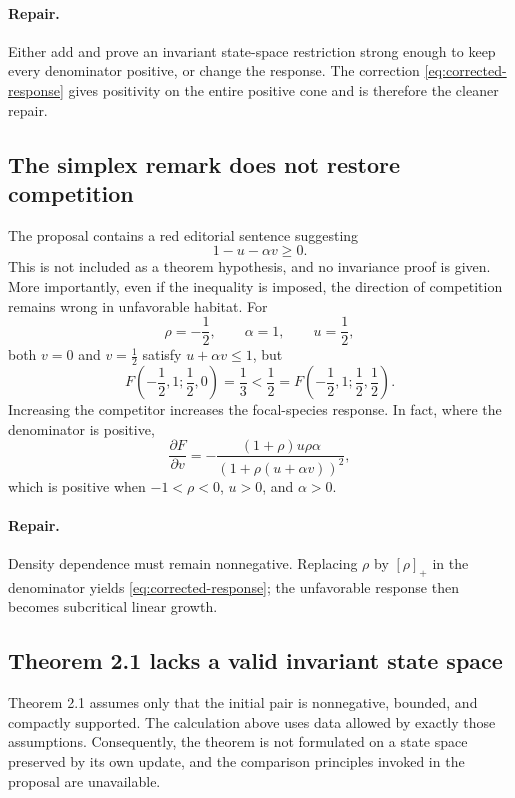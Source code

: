 \documentclass[11pt]{article}
\theoremstyle{definition}
\begin{document}
\paragraph{Repair.}
Either add and prove an invariant state-space restriction strong enough to
keep every denominator positive, or change the response.  The correction
\eqref{eq:corrected-response} gives positivity on the entire positive cone
and is therefore the cleaner repair.

\subsection{The simplex remark does not restore competition}

The proposal contains a red editorial sentence suggesting
\[
  1-u-\alpha v\geq0.
\]
This is not included as a theorem hypothesis, and no invariance proof is
given.  More importantly, even if the inequality is imposed, the direction
of competition remains wrong in unfavorable habitat.  For
\[
  \rho=-\frac12,\qquad \alpha=1,\qquad u=\frac12,
\]
both \(v=0\) and \(v=\frac12\) satisfy \(u+\alpha v\leq1\), but
\[
  F\!\left(-\frac12,1;\frac12,0\right)=\frac13
  <
  \frac12
  =
  F\!\left(-\frac12,1;\frac12,\frac12\right).
\]
Increasing the competitor increases the focal-species response.  In fact,
where the denominator is positive,
\[
  \frac{\partial F}{\partial v}
  =
  -\frac{(1+\rho)u\rho\alpha}
         {(1+\rho(u+\alpha v))^2},
\]
which is positive when \(-1<\rho<0\), \(u>0\), and \(\alpha>0\).

\paragraph{Repair.}
Density dependence must remain nonnegative.  Replacing \(\rho\) by
\([\rho]_+\) in the denominator yields
\eqref{eq:corrected-response}; the unfavorable response then becomes
subcritical linear growth.

\subsection{Theorem 2.1 lacks a valid invariant state space}

Theorem 2.1 assumes only that the initial pair is nonnegative, bounded, and
compactly supported.  The calculation above uses data allowed by exactly
those assumptions.  Consequently, the theorem is not formulated on a state
space preserved by its own update, and the comparison principles invoked in
the proposal are unavailable.
\end{document}
